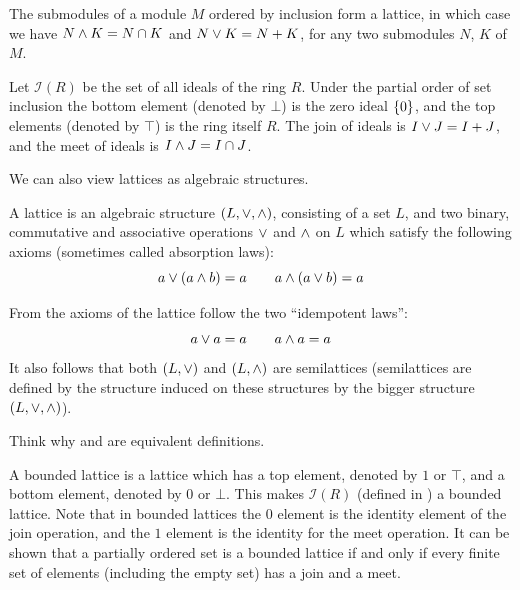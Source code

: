\documentclass[11pt,a4paper]{article}
\begin{document}
\begin{example}
  The submodules of a module $M$ ordered by inclusion form a lattice,
  in which case we have $N \wedge K = N \cap K$
  and $N \vee K = N + K$, for any two submodules $N$, $K$ of $M$.
\end{example}

\begin{example}
  \label{ex:lattice-of-ideals}
  Let $\mathcal I(R)$ be the set of all ideals of the ring $R$.
  Under the partial order of set inclusion the bottom element
  (denoted by $\bot$) is the zero ideal $\left\{0\right\}$,
  and the top elements (denoted by $\top$) is the ring itself $R$.
  The join of ideals is $I \vee J = I + J$,
  and the meet of ideals is $I \wedge J = I \cap J$.
\end{example}

\begin{remark}
  We can also view lattices as algebraic structures.
\end{remark}

\begin{definition}[Lattice]
  \label{def:lattice-algebra}
  A lattice is an algebraic structure $(L,\vee,\wedge)$, consisting of a set $L$,
  and two binary, commutative and associative operations $\vee$ and $\wedge$ on $L$
  which satisfy the following axioms (sometimes called absorption laws):
  \[
    a \vee (a \wedge b) = a \qquad
    a \wedge (a \vee b) = a
  \]
\end{definition}

\begin{remark}
  From the axioms of the lattice follow the two ``idempotent laws'':
  \[
    a \vee a = a \qquad a \wedge a = a
  \]
  It also follows that both $(L,\vee)$ and $(L,\wedge)$ are semilattices
  (semilattices are defined by the structure induced on these structures by
  the bigger structure $(L,\vee,\wedge)$).
\end{remark}

\begin{exercise}
  \label{ex:think}
  Think why  and  are equivalent
  definitions.
\end{exercise}

\begin{remark}
  A bounded lattice is a lattice which has a top element, denoted by $1$ or $\top$,
  and a bottom element, denoted by $0$ or $\bot$.
  This makes $\mathcal I(R)$ (defined in )
  a bounded lattice.
  Note that in bounded lattices the $0$ element is the identity element of the
  join operation, and the $1$ element is the identity for the meet operation.
  It can be shown that a partially ordered set is a bounded lattice if and only if
  every finite set of elements (including the empty set) has a join and a meet.
\end{remark}
\end{document}
